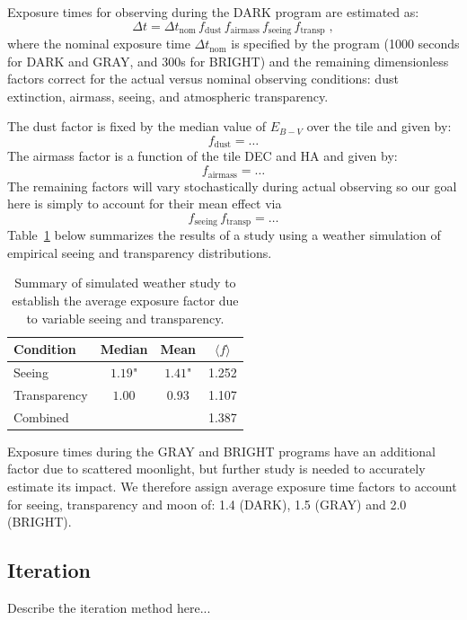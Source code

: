 \documentclass[12pt]{article}
\providecommand{\tab}[1]{Table~\ref{tab:#1}}
\begin{document}
Exposure times for observing during the DARK program are estimated as:
$$
\Delta t = \Delta t_{\text{nom}}\, f_{\text{dust}}\, f_{\text{airmass}}\,
f_{\text{seeing}}\, f_{\text{transp}} \; ,
$$
where the nominal exposure time $\Delta t_{\text{nom}}$ is specified by the program (1000 seconds for DARK and GRAY, and 300s for BRIGHT) and the remaining dimensionless factors correct for the actual versus nominal observing conditions: dust extinction, airmass, seeing, and atmospheric transparency.

The dust factor is fixed by the median value of $E_{B-V}$ over the tile and given by:
$$
f_{\text{dust}} = \ldots
$$
The airmass factor is a function of the tile DEC and HA and given by:
$$
f_{\text{airmass}} = \ldots
$$
The remaining factors will vary stochastically during actual observing so our goal here is simply to account for their mean effect via
$$
f_{\text{seeing}}\, f_{\text{transp}} = \ldots
$$
\tab{expfac} below summarizes the results of a study using a weather simulation of empirical seeing and transparency distributions.

\begin{table}[htb]
\begin{center}
\begin{tabular}{lccc}
Condition & Median & Mean & $\langle f\rangle$ \\
\hline
Seeing & $1.19$" & $1.41$" & 1.252 \\
Transparency & $1.00$ & $0.93$ & 1.107 \\
\hline
Combined & & & 1.387 \\
\end{tabular}
\caption{Summary of simulated weather study to establish the average exposure factor due to variable seeing and transparency.}
\label{tab:expfac}
\end{center}
\end{table}

Exposure times during the GRAY and BRIGHT programs have an additional factor due to scattered moonlight, but further study is needed to accurately estimate its impact.  We therefore assign average exposure time factors to account for seeing, transparency and moon of: 1.4 (DARK), 1.5 (GRAY) and 2.0 (BRIGHT).

\subsection{Iteration}

Describe the iteration method here...
\end{document}
